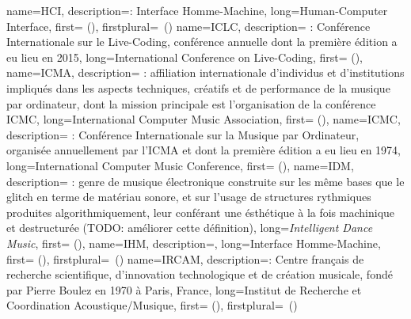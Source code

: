{
    name={HCI},
    description={\textit{}: Interface Homme-Machine},
    long={Human-Computer Interface},
    first={} (),
    firstplural={\glspluralsuffix\ (\glspluralsuffix)}
}
{
    name={ICLC},
    description={\textit{} : Conférence Internationale sur le Live-Coding, conférence annuelle dont la première édition a eu lieu en 2015},
    long={International Conference on Live-Coding},
    first={} (),
}
{
    name={ICMA},
    description={\textit{} : affiliation internationale d'individus et d'institutions impliqués dans les aspects techniques, créatifs et de performance de la musique par ordinateur, dont la mission principale est l'organisation de la conférence \gls{ICMC}},
    long={International Computer Music Association},
    first={} (),
}
{
    name={ICMC},
    description={\textit{} : Conférence Internationale sur la Musique par Ordinateur, organisée annuellement par l'\gls{ICMA} et dont la première édition a eu lieu en 1974},
    long={International Computer Music Conference},
    first={} (),
}
{
    name={IDM},
    description={\textit{} : genre de musique électronique construite sur les même bases que le \gls{glitch} en terme de matériau sonore, et sur l'usage de structures rythmiques produites algorithmiquement, leur conférant une ésthétique à la fois machinique et destructurée (TODO: améliorer cette définition)},
    long={\textit{Intelligent Dance Music}},
    first={} (),
}
{
    name={IHM},
    description={\textit{}},
    long={Interface Homme-Machine},
    first={} (),
    firstplural={\glspluralsuffix\ (\glspluralsuffix)}
}
{
    name={IRCAM},
    description={\textit{}: Centre français de recherche scientifique, d'innovation technologique et de création musicale, fondé par Pierre Boulez en 1970 à Paris, France},
    long={Institut de Recherche et Coordination Acoustique/Musique},
    first={} (),
    firstplural={\glspluralsuffix\ (\glspluralsuffix)}
}
